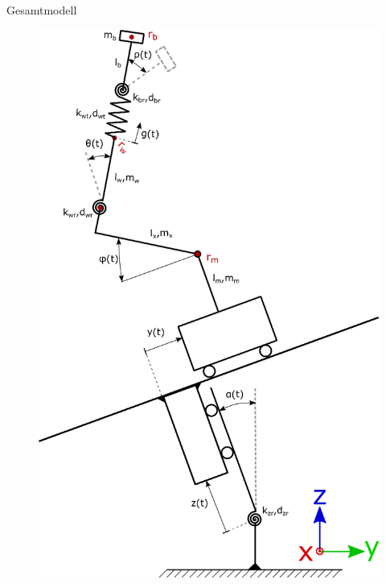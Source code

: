 \documentclass[10pt,xcolor=dvipsnames]{beamer}
\begin{document}
\begin{frame}{Gesamtmodell}
\begin{minipage}{0.38\textwidth}
\begin{figure}
				\includegraphics[width=1\linewidth]{./pics/SchematischesModell.eps}
			\end{figure}
		\end{minipage}
		\end{frame}
\end{document}
